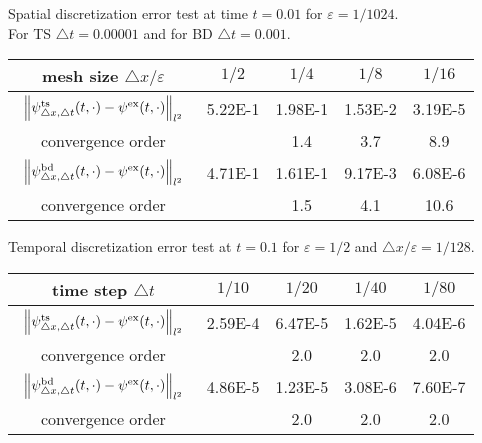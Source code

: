\documentclass[leqno,final]{siamltex}
\numberwithin{equation}{section}
\newcounter{me}
\begin{document}
\begin{table}[htbp]
\begin{center}
{Spatial discretization error test at time $t=0.01$ for ${{\varepsilon }}=1/1024$.\\
For TS ${\triangle} t=0.00001$ and for BD  ${\triangle} t=0.001$. }
\begin{tabular}{c|cccc}\hline
mesh size ${\triangle} x/{{\varepsilon }}$& $1/2$ & $1/4$ & $1/8$ &   $1/16$ \\ \hline
$\begin{array}{c}\vspace*{-4mm} \\
\left\|\psi^{\rm ts}_{{\triangle} x,{\triangle} t}(t,\cdot)-\psi^{\rm
ex}(t,\cdot)\right\|_{l^2}\\ \vspace*{-4mm} \end{array}$
 &  5.22E-1 & 1.98E-1 &  1.53E-2 & 3.19E-5 \\ \hline
convergence order & & 1.4 & 3.7& 8.9 \\ \hline \hline
$\begin{array}{c}\vspace*{-4mm} \\
\left\|\psi^{\rm bd}_{{\triangle} x,{\triangle} t}(t,\cdot)-\psi^{\rm
ex}(t,\cdot)\right\|_{l^2}\\ \vspace*{-4mm} \end{array}$
 &  4.71E-1& 1.61E-1 &  9.17E-3 &  6.08E-6 \\ \hline
convergence order & & 1.5& 4.1& 10.6  \\ \hline 
\end{tabular}\vspace{5mm}

{Temporal discretization error test at $t=0.1$ for ${{\varepsilon }}=1/2$ and
${\triangle} x/{{\varepsilon }}=1/128$.}
\begin{tabular}{c|cccc}\hline
time step ${\triangle} t$& $1/10$ & $1/20$ & $1/40$ &   $1/80$ \\ \hline
$\begin{array}{c}\vspace*{-4mm} \\
\left\|\psi^{\rm ts}_{{\triangle} x,{\triangle} t}(t,\cdot)-\psi^{\rm
ex}(t,\cdot)\right\|_{l^2}\\ \vspace*{-4mm} \end{array}$
 &  2.59E-4 & 6.47E-5 &  1.62E-5 & 4.04E-6 \\ \hline
convergence order & & 2.0 & 2.0& 2.0 \\ \hline \hline
$\begin{array}{c}\vspace*{-4mm} \\
\left\|\psi^{\rm bd}_{{\triangle} x,{\triangle} t}(t,\cdot)-\psi^{\rm
ex}(t,\cdot)\right\|_{l^2}\\ \vspace*{-4mm} \end{array}$
 &  4.86E-5& 1.23E-5 &  3.08E-6 & 7.60E-7 \\ \hline
convergence order & & 2.0 & 2.0& 2.0  \\ \hline 
\end{tabular}\vspace{5mm}


\end{center}
\end{table}
\end{document}
